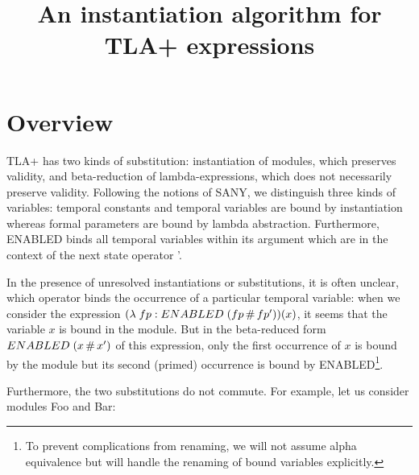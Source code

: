 \documentclass[a4paper]{article}
\title{An instantiation algorithm for TLA+ expressions}
\author{}
\newcommand{\tlaplus}[0]{{TLA+}}
\newcommand{\tla}[1]{#1}
\theoremstyle{definition}
\begin{document}
\maketitle

\section{Overview}
\label{sec:overview}
\tlaplus{} has two kinds of substitution: instantiation of modules, which
preserves validity, and beta-reduction of lambda-expressions, which does not
necessarily preserve validity. Following the notions of SANY, we distinguish
three kinds of variables: temporal constants and temporal variables are
bound by instantiation whereas formal parameters are bound by lambda
abstraction. Furthermore, ENABLED binds all temporal variables within its
argument which are in the context of the next state operator '.

In the presence of unresolved instantiations or substitutions, it is often
unclear, which operator binds the occurrence of a particular temporal variable:
when we consider the expression
\tla{$(\lambda\; fp : ENABLED\; (fp \,\#\, fp'))(x)$}, it seems that the variable
$x$ is bound in the module. But in the beta-reduced form $ENABLED\; (x \,\#\, x')$
of this expression, only the first occurrence of $x$ is bound by the
module but its second (primed) occurrence is bound by ENABLED\footnote{To
  prevent complications from renaming, we will not assume alpha equivalence but
  will handle the renaming of bound variables explicitly.}.

Furthermore, the two substitutions do not commute. For example, let us
consider modules Foo and Bar:

\begin{parcolumns}{2}
\end{parcolumns}
\end{document}
